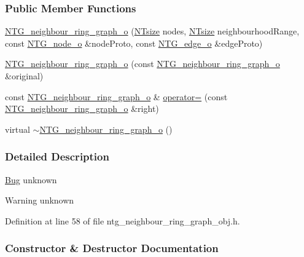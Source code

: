 \subsubsection*{Public Member Functions}
\begin{DoxyCompactItemize}
\item 
\hyperlink{class_n_t_g__neighbour__ring__graph__o_a9ebe4061cf3c40810fd5a581a00ee631}{NTG\_\-neighbour\_\-ring\_\-graph\_\-o} (\hyperlink{nt__types_8h_a06c124f2e4469769b58230253ce0560b}{NTsize} nodes, \hyperlink{nt__types_8h_a06c124f2e4469769b58230253ce0560b}{NTsize} neighbourhoodRange, const \hyperlink{class_n_t_g__node__o}{NTG\_\-node\_\-o} \&nodeProto, const \hyperlink{class_n_t_g__edge__o}{NTG\_\-edge\_\-o} \&edgeProto)
\item 
\hyperlink{class_n_t_g__neighbour__ring__graph__o_a803576a7ce59cafa59eb0e25d92df13d}{NTG\_\-neighbour\_\-ring\_\-graph\_\-o} (const \hyperlink{class_n_t_g__neighbour__ring__graph__o}{NTG\_\-neighbour\_\-ring\_\-graph\_\-o} \&original)
\item 
const \hyperlink{class_n_t_g__neighbour__ring__graph__o}{NTG\_\-neighbour\_\-ring\_\-graph\_\-o} \& \hyperlink{class_n_t_g__neighbour__ring__graph__o_a7ab55ad540b017c16e80a9a3b910bb75}{operator=} (const \hyperlink{class_n_t_g__neighbour__ring__graph__o}{NTG\_\-neighbour\_\-ring\_\-graph\_\-o} \&right)
\item 
virtual \hyperlink{class_n_t_g__neighbour__ring__graph__o_a1fda7e5d82aaf99bb28403afaf8ea278}{$\sim$NTG\_\-neighbour\_\-ring\_\-graph\_\-o} ()
\end{DoxyCompactItemize}


\subsubsection{Detailed Description}
\begin{Desc}
\item[\hyperlink{bug__bug000087}{Bug}]unknown \end{Desc}
\begin{DoxyWarning}{Warning}
unknown 
\end{DoxyWarning}


Definition at line 58 of file ntg\_\-neighbour\_\-ring\_\-graph\_\-obj.h.



\subsubsection{Constructor \& Destructor Documentation}
